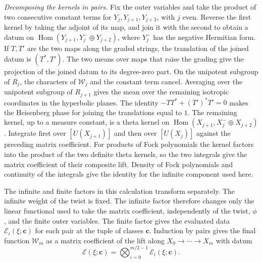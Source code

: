 \emph{Decomposing the kernels in pairs.}
Fix the outer variables and take the product of two consecutive
constant terms for \(Y_j,Y_{j+1},Y_{j+2}\), with \(j\) even.
Reverse the first kernel by taking the adjoint of its map, and join
it with the second to obtain a datum on
\(\operatorname{Hom}(Y_{j+1},Y_j^{-}\oplus Y_{j+2})\), where \(Y_j^{-}\)
has the negative Hermitian form. If \(T,T'\) are the two maps along
the graded strings, the translation of the joined datum is
\((T^\ast,T')\).
The two means over maps that raise the grading give the projection
of the joined datum to its degree-zero part.
On the unipotent subgroup of \(R_j\), the characters of
\(\mathcal W_j\) and the constant term cancel.
Averaging over the unipotent subgroup of \(R_{j+1}\) gives the mean
over the remaining isotropic coordinates in the hyperbolic planes.
The identity \(-TT^\ast+(T')^\ast T'=0\) makes the Heisenberg phase
for joining the translations equal to \(1\).
The remaining kernel, up to a measure constant, is a theta kernel
on \(\operatorname{Hom}(X_{j+1},X_j^{-}\oplus X_{j+2})\).
Integrate first over \([U(X_{j+1})]\) and then over \([U(X_j)]\)
against the preceding matrix coefficient.
For products of Fock polynomials the kernel factors into the product
of the two definite theta kernels, so the two integrals give the
matrix coefficient of their composite lift.
Density of Fock polynomials and continuity of the integrals give the
identity for the infinite component used here.

The infinite and finite factors in this calculation transform separately.
The infinite weight of the twist is fixed. The infinite factor therefore
changes only the linear functional used to take the matrix coefficient,
independently of the twist, \(\phi\), and the finite outer variables.
The finite factor gives the evaluated data \(\mathcal E_i(\xi;\boldsymbol c)\)
for each pair at the tuple of classes \(\boldsymbol c\).
Induction by pairs gives the final function \(\mathcal W_m\) as a matrix
coefficient of the lift along \(X_0\to\cdots\to X_m\) with datum
\[
  \mathcal E(\xi;\boldsymbol c)
  =\bigotimes_{i=0}^{m/2-1}\mathcal E_i(\xi;\boldsymbol c).
\]

